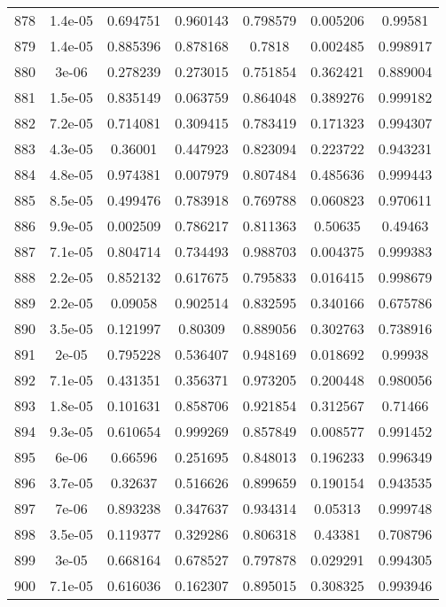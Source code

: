 \begin{table}
\begin{tabular}{c|c|c|c|c|c|c}
878 & 1.4e-05 & 0.694751 & 0.960143 & 0.798579 & 0.005206 & 0.99581\\
879 & 1.4e-05 & 0.885396 & 0.878168 & 0.7818 & 0.002485 & 0.998917\\
880 & 3e-06 & 0.278239 & 0.273015 & 0.751854 & 0.362421 & 0.889004\\
881 & 1.5e-05 & 0.835149 & 0.063759 & 0.864048 & 0.389276 & 0.999182\\
882 & 7.2e-05 & 0.714081 & 0.309415 & 0.783419 & 0.171323 & 0.994307\\
883 & 4.3e-05 & 0.36001 & 0.447923 & 0.823094 & 0.223722 & 0.943231\\
884 & 4.8e-05 & 0.974381 & 0.007979 & 0.807484 & 0.485636 & 0.999443\\
885 & 8.5e-05 & 0.499476 & 0.783918 & 0.769788 & 0.060823 & 0.970611\\
886 & 9.9e-05 & 0.002509 & 0.786217 & 0.811363 & 0.50635 & 0.49463\\
887 & 7.1e-05 & 0.804714 & 0.734493 & 0.988703 & 0.004375 & 0.999383\\
888 & 2.2e-05 & 0.852132 & 0.617675 & 0.795833 & 0.016415 & 0.998679\\
889 & 2.2e-05 & 0.09058 & 0.902514 & 0.832595 & 0.340166 & 0.675786\\
890 & 3.5e-05 & 0.121997 & 0.80309 & 0.889056 & 0.302763 & 0.738916\\
891 & 2e-05 & 0.795228 & 0.536407 & 0.948169 & 0.018692 & 0.99938\\
892 & 7.1e-05 & 0.431351 & 0.356371 & 0.973205 & 0.200448 & 0.980056\\
893 & 1.8e-05 & 0.101631 & 0.858706 & 0.921854 & 0.312567 & 0.71466\\
894 & 9.3e-05 & 0.610654 & 0.999269 & 0.857849 & 0.008577 & 0.991452\\
895 & 6e-06 & 0.66596 & 0.251695 & 0.848013 & 0.196233 & 0.996349\\
896 & 3.7e-05 & 0.32637 & 0.516626 & 0.899659 & 0.190154 & 0.943535\\
897 & 7e-06 & 0.893238 & 0.347637 & 0.934314 & 0.05313 & 0.999748\\
898 & 3.5e-05 & 0.119377 & 0.329286 & 0.806318 & 0.43381 & 0.708796\\
899 & 3e-05 & 0.668164 & 0.678527 & 0.797878 & 0.029291 & 0.994305\\
900 & 7.1e-05 & 0.616036 & 0.162307 & 0.895015 & 0.308325 & 0.993946\\
\end{tabular}
\end{table}
